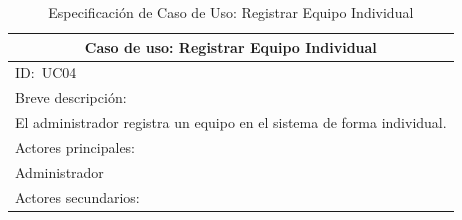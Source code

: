 \documentclass[stu, 12pt, letterpaper, donotrepeattitle, floatsintext, natbib]{apa7}
\begin{document}
\begin{longtable}{@{} p{16.5cm} @{}}
    \caption{Especificación de Caso de Uso: Registrar Equipo Individual}\label{tab:UC04}                                                                                                                                                                                       \\ \toprule
    \multicolumn{1}{c}{Caso de uso: Registrar Equipo Individual}                                                                                                                                                                                                               \\ \midrule
    ID:~UC04                                                                                                                                                                                                                                                                   \\ \midrule
    Breve descripción:                                                                                                                                                                                                                                                         \\
    El administrador registra un equipo en el sistema de forma individual.                                                                                                                                                                                                     \\ \midrule
    Actores principales:                                                                                                                                                                                                                                                       \\
    Administrador                                                                                                                                                                                                                                                              \\ \midrule
    Actores secundarios:                                                                                                                                                                                                                                                       \\

\end{longtable}
\end{document}
